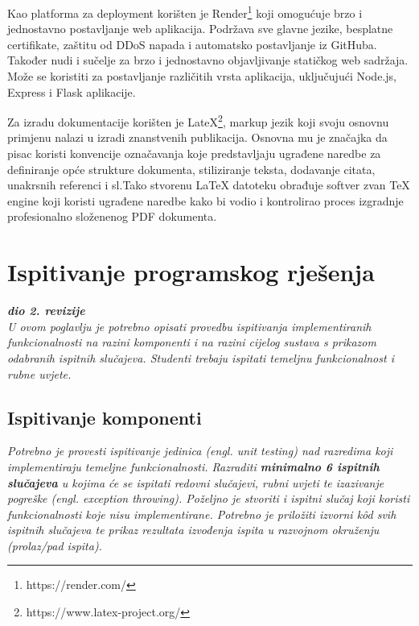              Kao platforma za deployment korišten je Render\footnote{https://render.com/} koji omogućuje brzo i jednostavno postavljanje web aplikacija. Podržava sve glavne jezike, besplatne certifikate, zaštitu od DDoS napada i automatsko postavljanje iz GitHuba. Također nudi i sučelje za brzo i jednostavno objavljivanje statičkog web sadržaja. Može se koristiti za postavljanje različitih vrsta aplikacija, uključujući Node.js, Express i Flask aplikacije.		 
			 
			 Za izradu dokumentacije korišten je LateX\footnote{https://www.latex-project.org/}, markup jezik koji svoju osnovnu primjenu nalazi u izradi znanstvenih publikacija. Osnovna mu je značajka da pisac koristi konvencije označavanja koje predstavljaju ugrađene naredbe za definiranje opće strukture dokumenta, stiliziranje teksta, dodavanje citata, unakrsnih referenci i sl.Tako stvorenu LaTeX datoteku obrađuje softver zvan TeX engine koji koristi ugrađene naredbe kako bi vodio i kontrolirao proces izgradnje profesionalno složenenog PDF dokumenta.
			\eject 
		
	
		\section{Ispitivanje programskog rješenja}
			
			\textbf{\textit{dio 2. revizije}}\\
			
			 \textit{U ovom poglavlju je potrebno opisati provedbu ispitivanja implementiranih funkcionalnosti na razini komponenti i na razini cijelog sustava s prikazom odabranih ispitnih slučajeva. Studenti trebaju ispitati temeljnu funkcionalnost i rubne uvjete.}
	
			
			\subsection{Ispitivanje komponenti}
			\textit{Potrebno je provesti ispitivanje jedinica (engl. unit testing) nad razredima koji implementiraju temeljne funkcionalnosti. Razraditi \textbf{minimalno 6 ispitnih slučajeva} u kojima će se ispitati redovni slučajevi, rubni uvjeti te izazivanje pogreške (engl. exception throwing). Poželjno je stvoriti i ispitni slučaj koji koristi funkcionalnosti koje nisu implementirane. Potrebno je priložiti izvorni kôd svih ispitnih slučajeva te prikaz rezultata izvođenja ispita u razvojnom okruženju (prolaz/pad ispita). }
			
			
			
